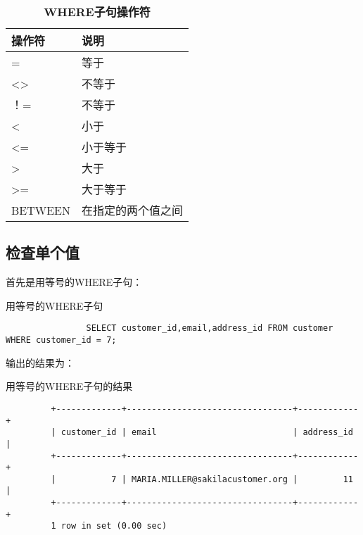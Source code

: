 \documentclass[UTF8]{article}
\begin{document}
\begin{table}[H]
        \caption{\textbf{WHERE子句操作符}}%
        \centering%
        \begin{tabular}{ll}%
        \toprule%
        操作符&说明\\
        \midrule%
        =       &       等于                    \\
        <>      &       不等于                  \\
        ！=     &       不等于                  \\
        <       &       小于                    \\
        <=      &       小于等于                \\
        >       &       大于                   \\
        >=      &       大于等于               \\
        BETWEEN &       在指定的两个值之间      \\
        \bottomrule%
        \end{tabular}
\end{table}  

\subsection{检查单个值}
首先是用等号的WHERE子句：
\begin{listing}[H]
	\caption{用等号的WHERE子句}
	\label{code:equalwhereclause}
	\begin{verbatim}
                SELECT customer_id,email,address_id FROM customer WHERE customer_id = 7;
        \end{verbatim}
\end{listing}

输出的结果为：

\begin{listing}[H]
	\caption{用等号的WHERE子句的结果}
	\label{code:equalwhereclauseresult}
	\begin{verbatim}
         +-------------+---------------------------------+------------+
         | customer_id | email                           | address_id |
         +-------------+---------------------------------+------------+
         |           7 | MARIA.MILLER@sakilacustomer.org |         11 |
         +-------------+---------------------------------+------------+
         1 row in set (0.00 sec)

        \end{verbatim}
\end{listing}
\end{document}
